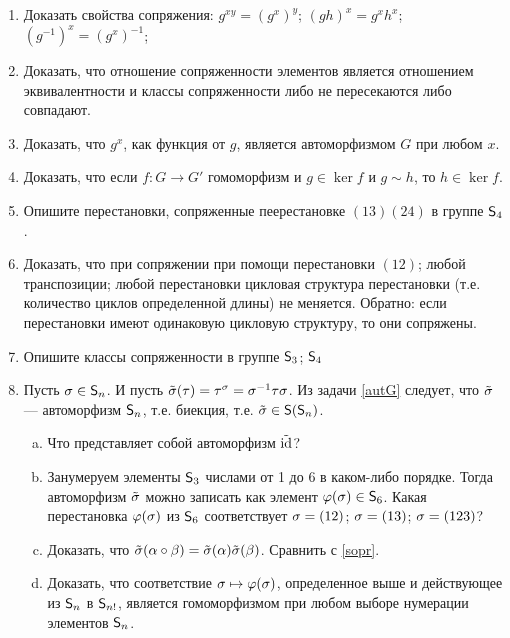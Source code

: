 \begin{enumerate}
\item Доказать свойства сопряжения: \ipunkt $g^{xy}=(g^x)^y$; \ipunkt $(gh)^{x}=g^xh^x$; \ipunkt $(g^{-1})^x=(g^x)^{-1}$;\label{sopr}

\item Доказать, что отношение сопряженности элементов является отношением эквивалентности и классы сопряженности либо не пересекаются либо совпадают.

\item Доказать, что $g^x$, как функция от $g$, является автоморфизмом $G$ при любом $x$.\label{autG}

\item Доказать, что если $f:G\to G'$ гомоморфизм и $g\in\ker f$ и $g\sim h$, то $h\in\ker f$.

\item Опишите перестановки, сопряженные пеерестановке $(13)(24)$ в группе ${\mathsf{S}}_4$.

\item Доказать, что при сопряжении при помощи \ipunkt перестановки $(12)$; \ipunkt любой транспозиции; \ipunkt любой перестановки цикловая структура перестановки (т.е. количество циклов определенной длины) не меняется. \ipunkt Обратно: если перестановки имеют одинаковую цикловую структуру, то они сопряжены.

\item Опишите классы сопряженности в группе \ipunkt ${\mathsf{S}}_3$; \ipunkt ${\mathsf{S}}_4$

\item Пусть $\sigma\in{\mathsf{S}}_n$. И пусть $\tilde{\sigma}(\tau)=\tau^\sigma=\sigma^{-1}\tau\sigma$. Из задачи \ref{autG} следует, что 
$\tilde{\sigma}$ --- автоморфизм ${\mathsf{S}}_n$, т.е. биекция, т.е. $\tilde{\sigma}\in {\mathsf{S}}({\mathsf{S}}_n)$.
\begin{enumerate}[a)]
\item Что представляет собой автоморфизм $\tilde{\mathrm{id}}$?
\item Занумеруем элементы ${\mathsf{S}}_3$ числами от 1 до 6 в каком-либо порядке. Тогда автоморфизм $\tilde{\sigma}$ можно записать как элемент $\varphi(\sigma)\in{\mathsf{S}}_6$. Какая перестановка $\varphi(\sigma)$ из ${\mathsf{S}}_6$ соответствует \ipunkt $\sigma=(12)$; \ipunkt $\sigma=(13)$; \ipunkt $\sigma=(123)$?
\item Доказать, что $\tilde{\sigma}(\alpha\circ\beta)=\tilde{\sigma}(\alpha)\tilde{\sigma}(\beta)$. Сравнить с \ref{sopr}.
\item Доказать, что соответствие $\sigma\mapsto\varphi(\sigma)$, определенное выше и действующее из ${\mathsf{S}}_n$ в ${\mathsf{S}}_{n!}$, является гомоморфизмом при любом выборе нумерации элементов ${\mathsf{S}}_n$.
\end{enumerate}


\end{enumerate}
